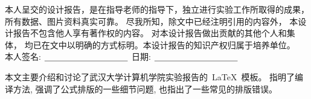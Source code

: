 


\newpage
\thispagestyle{empty}
\vspace*{20pt}
\begin{center}{}\end{center}
\par\vspace*{30pt}
\renewcommand{\baselinestretch}{2}

{%

本人呈交的设计报告，是在指导老师的指导下，独立进行实验工作所取得的成果，
所有数据、图片资料真实可靠。 尽我所知，除文中已经注明引用的内容外，
本设计报告不包含他人享有著作权的内容。
对本设计报告做出贡献的其他个人和集体，
均已在文中以明确的方式标明。本设计报告的知识产权归属于培养单位。\\[2cm]

\hspace*{1cm}本人签名: $\underline{\hspace{3.5cm}}$
\hspace{2cm}日期: $\underline{\hspace{3.5cm}}$\hfill\par}
\baselineskip=23pt  %





\begin{cnabstract}
\thispagestyle{empty}

本文主要介绍和讨论了武汉大学计算机学院实验报告的~\LaTeX~模板。
指明了编译方法, 强调了公式排版的一些细节问题, 也指出了一些常见的排版错误。


\end{cnabstract}
\par
\vspace*{2em}






